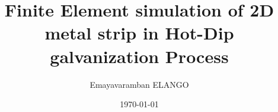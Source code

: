 \documentclass[9pt]{beamer}
\title{Finite Element simulation of 2D metal strip in Hot-Dip galvanization Process}
\author{Emayavaramban ELANGO}
\institute{Ecole Centrale De Nantes}
\date{\today}
\begin{document}


\begin{frame}
\titlepage
\end{frame}
 
 
 
\end{document}
